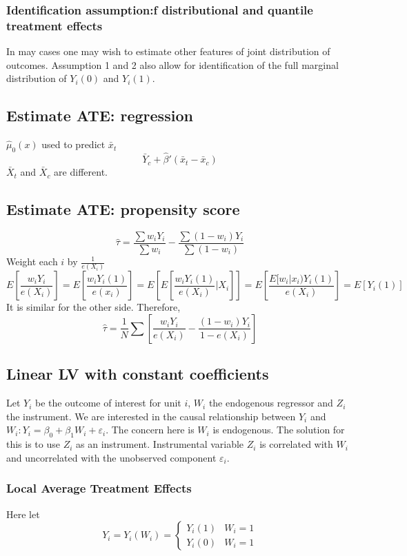 \documentclass[11pt, a4paper, oneside]{article}
\theoremstyle{definition}
\theoremstyle{proposition}
\theoremstyle{corollary}
\theoremstyle{lemma}
\theoremstyle{theorem}
\begin{document}
\subsubsection{Identification assumption:f distributional and quantile treatment effects}
In may cases one may wish to estimate other features of joint distribution of outcomes. Assumption 1 and 2 also allow for identification of the full marginal distribution of $Y_i(0)$ and $Y_i(1)$. 

\subsection{Estimate ATE: regression}
$\hat{\mu}_0(x)$ used to predict $\bar{x}_t$ 
$$\bar{Y}_c+ \hat{\beta}'(\bar{x}_t - \bar{x}_c)$$
$\bar{X}_t$ and $\bar{X}_c$ are different. 

\subsection{Estimate ATE: propensity score}
$$\hat{\tau} = \frac{\sum w_i Y_i}{\sum w_i}  - \frac{\sum (1 - w_i) Y_i}{\sum (1 - w_i)}$$
Weight each $i$ by $\frac{1}{e(X_i)}$
$$E\left[\frac{w_iY_i}{e(X_i)}\right] = E\left[\frac{w_iY_i(1)}{e(x_i)}\right] = E\left[E\left[\frac{w_iY_i(1)}{e(X_i)}|X_i\right]\right] =E\left[\frac{E[w_i|x_i)Y_i(1)}{e(X_i)}\right] = E[Y_i(1)]$$
It is similar for the other side. Therefore, $$\hat{\tau} =\frac{1}{N}\sum \left[\frac{w_i Y_i}{e(X_i)} - \frac{(1-w_i)Y_i}{1 - e(X_i)}\right]$$


\subsection{Linear LV with constant coefficients}
Let $Y_i$ be the outcome of interest for unit $i$, $W_i$ the endogenous regressor and $Z_i$ the instrument. We are interested in the causal relationship between $Y_i$ and $ W_i: Y_i =\beta_0 + \beta_1W_i + \varepsilon_i$. The concern here is $W_i$ is endogenous. The solution for this is to use $Z_i$ as an instrument. Instrumental variable $Z_i$ is correlated with $W_i$ and uncorrelated with the unobserved component $\varepsilon_i$. 

\subsubsection{Local Average Treatment Effects}
Here let $$Y_i = Y_i(W_i) = \begin{cases}
Y_i(1) & W_i = 1\\
Y_i(0) & W_i = 1
\end{cases}$$
\end{document}
